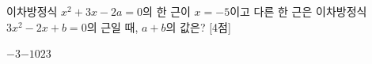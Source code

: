 이차방정식 $x^2+3x-2a=0$의 한 근이 $x=-5$이고 다른 한 근은 이차방정식 $3x^2-2x+b=0$의 근일 때, $a+b$의 값은?  \mbox{[4점]}
\begin{choices32}{$-3$}{$-1$}{$0$}{$2$}{$3$}\end{choices32}
